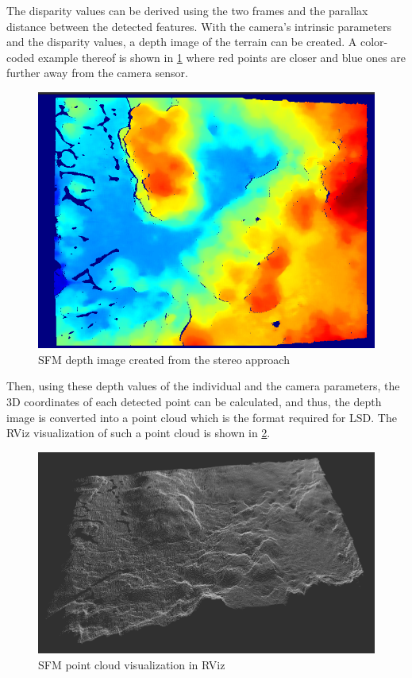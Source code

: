 The disparity values can be derived using the two frames and the parallax distance between the detected features. With the camera's intrinsic parameters and the disparity values, a depth image of the terrain can be created. A color-coded example thereof is shown in \cref{fig:sfm_depth_image} where red points are closer and blue ones are further away from the camera sensor.

\begin{figure}[h]
\centering
\includegraphics[scale=0.4]{images/system_overview/sfm_depth_image.png}
\caption{SFM depth image created from the stereo approach}
\label{fig:sfm_depth_image}
\end{figure}

Then, using these depth values of the individual and the camera parameters, the 3D coordinates of each detected point can be calculated, and thus, the depth image is converted into a point cloud which is the format required for LSD. The RViz visualization of such a point cloud is shown in \cref{fig:sfm_point_cloud}.


\begin{figure}[h]
\centering
\includegraphics[scale=0.2]{images/system_overview/sfm_depth_map.png}
\caption{SFM point cloud visualization in RViz}
\label{fig:sfm_point_cloud}
\end{figure}
\clearpage

